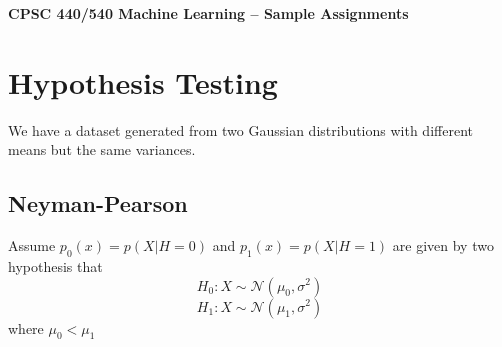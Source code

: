\documentclass{article}
\begin{document}
\begin{center}
\Large
\textbf{CPSC 440/540 Machine Learning -- Sample Assignments}
\end{center}


\section{Hypothesis Testing}
We have a dataset generated from two Gaussian distributions with different means but the same variances.

\subsection{Neyman-Pearson}
Assume $p_0(x) = p(X|H=0)$ and $p_1(x) = p(X|H=1)$ are given by two hypothesis that
\[
H_0: X \sim \mathcal{N}(\mu_0, \sigma^2)
\]
\[
H_1: X \sim \mathcal{N}(\mu_1, \sigma^2)
\]
where $\mu_0 < \mu_1$
\end{document}

